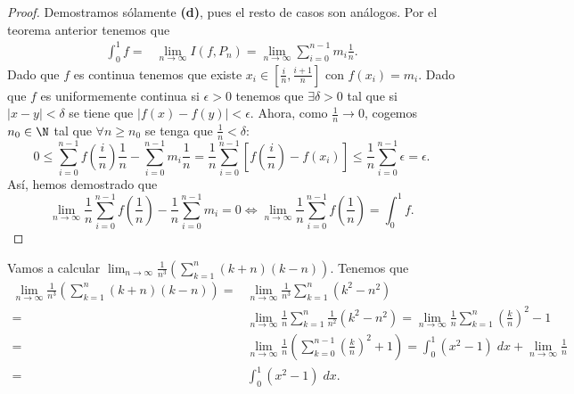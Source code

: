 \begin{proof}
Demostramos sólamente \textbf{(d)}, pues el resto de casos son análogos. Por el teorema anterior tenemos que
	\[
	\begin{split}
		\int^{1}_{0} f = & \lim_{n \to \infty}I\left(f,P_{n}\right) = \lim_{n \to \infty}\sum^{n-1}_{i = 0}m_{i} \frac{1}{n} .
	\end{split}
	\]
Dado que $\displaystyle f $ es continua tenemos que existe $\displaystyle x_{i} \in \left[\frac{i}{n}, \frac{i + 1}{n}\right]  $ con $\displaystyle f\left(x_{i}\right) = m_{i} $. Dado que $\displaystyle f $ es uniformemente continua si $\displaystyle \epsilon > 0 $ tenemos que $\displaystyle \exists \delta > 0 $ tal que si $\displaystyle \left|x-y\right|<\delta  $ se tiene que $\displaystyle \left|f\left(x\right)-f\left(y\right)\right| < \epsilon  $. 
Ahora, como $\displaystyle \frac{1}{n} \to 0 $, cogemos $\displaystyle n_{0} \in \N $ tal que $\displaystyle \forall n \geq n_{0} $ se tenga que $\displaystyle \frac{1}{n} < \delta  $:
\[ 0 \leq \sum^{n-1}_{i = 0}f\left(\frac{i}{n}\right)\frac{1}{n} - \sum^{n-1}_{i=0}m_{i}\frac{1}{n} = \frac{1}{n}\sum^{n-1}_{i=0}\left[f\left(\frac{i}{n}\right)-f\left(x_{i}\right)\right] \leq \frac{1}{n}\sum^{n-1}_{i = 0}\epsilon  = \epsilon.\]
	Así, hemos demostrado que 
	\[\lim_{n \to \infty}\frac{1}{n}\sum^{n-1}_{i = 0}f\left(\frac{1}{n}\right) - \frac{1}{n}\sum^{n-1}_{i = 0}m_{i} = 0 \iff \lim_{n \to \infty}\frac{1}{n}\sum^{n-1}_{i = 0}f\left(\frac{1}{n}\right) = \int^{1}_{0} f .\]
\end{proof}
\begin{eg}
\normalfont Vamos a calcular $\displaystyle \lim_{n \to \infty}\frac{1}{n^{3}}\left(\sum^{n}_{k=1}\left(k+n\right)\left(k-n\right)\right) $. Tenemos que 
\[
\begin{split}
	\lim_{n \to \infty}\frac{1}{n^{3}}\left(\sum^{n}_{k=1}\left(k+n\right)\left(k-n\right)\right) = & \lim_{n \to \infty}\frac{1}{n^{3}}\sum^{n}_{k=1}\left(k^{2}-n^{2}\right) \\
= & \lim_{n \to \infty}\frac{1}{n}\sum^{n}_{k=1}\frac{1}{n^{2}}\left(k^{2}-n^{2}\right) = \lim_{n \to \infty}\frac{1}{n}\sum^{n}_{k=1}\left(\frac{k}{n}\right)^{2}-1 \\
= &  \lim_{n \to \infty}\frac{1}{n}\left(\sum^{n-1}_{k=0}\left(\frac{k}{n}\right)^{2}+1\right) = \int^{1}_{0} \left(x^{2}-1\right) \; dx + \lim_{n \to \infty}\frac{1}{n} \\
= & \int^{1}_{0} \left(x^{2}-1\right) \; dx.
\end{split}
\]
\end{eg}
